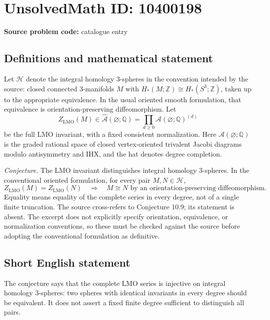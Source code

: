 \documentclass[11pt]{article}
\newcommand{\Z}{\mathbb{Z}}
\newcommand{\Q}{\mathbb{Q}}
\begin{document}
\section*{UnsolvedMath ID: 10400198}
\textbf{Source problem code:} catalogue entry
\subsection{Definitions and mathematical statement}
Let \(\mathcal H\) denote the integral homology \(3\)-spheres in the convention intended by the source: closed connected \(3\)-manifolds \(M\) with \(H_*(M;\Z)\cong H_*(S^3;\Z)\), taken up to the appropriate equivalence. In the usual oriented smooth formulation, that equivalence is orientation-preserving diffeomorphism. Let
\[
 Z_{\mathrm{LMO}}(M)\in\widehat{\mathcal A}(\varnothing;\Q)
 =\prod_{d\geq0}\mathcal A(\varnothing;\Q)^{(d)}
\]
be the full LMO invariant, with a fixed consistent normalization. Here \(\mathcal A(\varnothing;\Q)\) is the graded rational space of closed vertex-oriented trivalent Jacobi diagrams modulo antisymmetry and IHX, and the hat denotes degree completion.

\emph{Conjecture.} The LMO invariant distinguishes integral homology \(3\)-spheres. In the conventional oriented formulation, for every pair \(M,N\in\mathcal H\),
\[
 Z_{\mathrm{LMO}}(M)=Z_{\mathrm{LMO}}(N)
 \quad\Longrightarrow\quad
 M\cong N\text{ by an orientation-preserving diffeomorphism}.
\]
Equality means equality of the complete series in every degree, not of a single finite truncation. The source cross-refers to Conjecture 10.9; its statement is absent. The excerpt does not explicitly specify orientation, equivalence, or normalization conventions, so these must be checked against the source before adopting the conventional formulation as definitive.
\subsection{Short English statement}
The conjecture says that the complete LMO series is injective on integral homology \(3\)-spheres: two spheres with identical invariants in every degree should be equivalent. It does not assert a fixed finite degree sufficient to distinguish all pairs.
\end{document}
